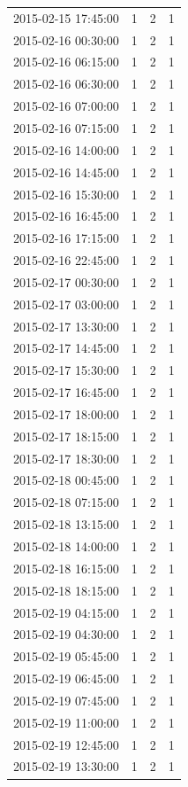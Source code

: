 \begin{tabular}{lrrr}
2015-02-15 17:45:00 & 1 & 2 & 1 \\
2015-02-16 00:30:00 & 1 & 2 & 1 \\
2015-02-16 06:15:00 & 1 & 2 & 1 \\
2015-02-16 06:30:00 & 1 & 2 & 1 \\
2015-02-16 07:00:00 & 1 & 2 & 1 \\
2015-02-16 07:15:00 & 1 & 2 & 1 \\
2015-02-16 14:00:00 & 1 & 2 & 1 \\
2015-02-16 14:45:00 & 1 & 2 & 1 \\
2015-02-16 15:30:00 & 1 & 2 & 1 \\
2015-02-16 16:45:00 & 1 & 2 & 1 \\
2015-02-16 17:15:00 & 1 & 2 & 1 \\
2015-02-16 22:45:00 & 1 & 2 & 1 \\
2015-02-17 00:30:00 & 1 & 2 & 1 \\
2015-02-17 03:00:00 & 1 & 2 & 1 \\
2015-02-17 13:30:00 & 1 & 2 & 1 \\
2015-02-17 14:45:00 & 1 & 2 & 1 \\
2015-02-17 15:30:00 & 1 & 2 & 1 \\
2015-02-17 16:45:00 & 1 & 2 & 1 \\
2015-02-17 18:00:00 & 1 & 2 & 1 \\
2015-02-17 18:15:00 & 1 & 2 & 1 \\
2015-02-17 18:30:00 & 1 & 2 & 1 \\
2015-02-18 00:45:00 & 1 & 2 & 1 \\
2015-02-18 07:15:00 & 1 & 2 & 1 \\
2015-02-18 13:15:00 & 1 & 2 & 1 \\
2015-02-18 14:00:00 & 1 & 2 & 1 \\
2015-02-18 16:15:00 & 1 & 2 & 1 \\
2015-02-18 18:15:00 & 1 & 2 & 1 \\
2015-02-19 04:15:00 & 1 & 2 & 1 \\
2015-02-19 04:30:00 & 1 & 2 & 1 \\
2015-02-19 05:45:00 & 1 & 2 & 1 \\
2015-02-19 06:45:00 & 1 & 2 & 1 \\
2015-02-19 07:45:00 & 1 & 2 & 1 \\
2015-02-19 11:00:00 & 1 & 2 & 1 \\
2015-02-19 12:45:00 & 1 & 2 & 1 \\
2015-02-19 13:30:00 & 1 & 2 & 1 \\

\end{tabular}
